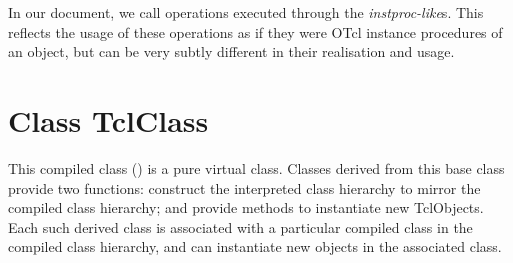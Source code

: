 In our document, we call operations executed through the 
 \emph{instproc-like}s.
This reflects the usage of these operations as if they were
OTcl instance procedures of an object,
but can be very subtly different in their realisation and usage.


\section{Class TclClass}
\label{sec:TclClass}

This compiled class ()
is a pure virtual class.
Classes derived from this base class provide two functions:
construct the interpreted class hierarchy
to mirror the compiled class hierarchy; and
provide methods to instantiate new TclObjects.
Each such derived class is associated with a particular compiled class
in the compiled class hierarchy, and can instantiate new objects in the
associated class.

